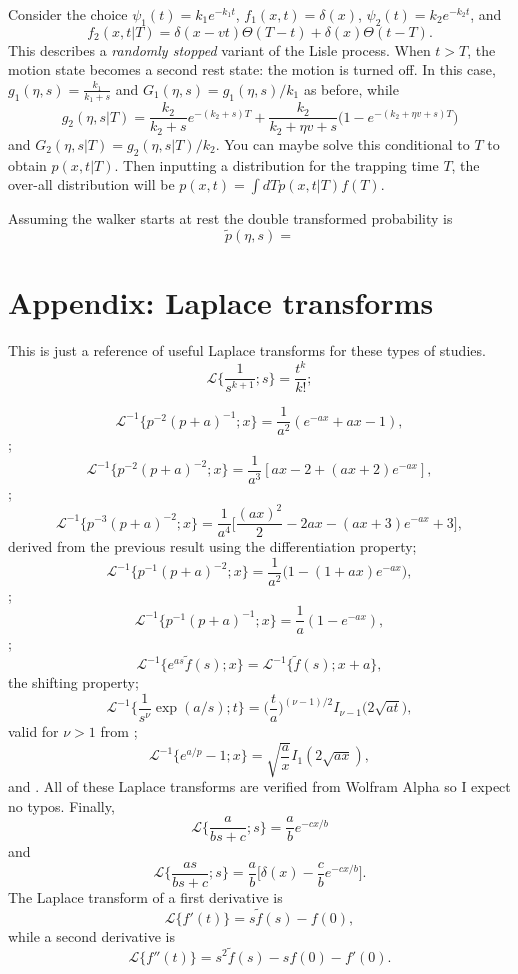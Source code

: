 \documentclass[11pt]{article}
\newcommand\be{\begin{equation}} %
\newcommand\ee{\end{equation}}   %
\newcommand\El{\mathcal{L}}
\begin{document}
Consider the choice $\psi_1(t) = k_1e^{-k_1t}$, $f_1(x,t)=\delta(x)$, $\psi_2(t) = k_2e^{-k_2t}$, and 
\be f_2(x,t|T) = \delta(x-vt)\Theta(T-t) + \delta(x)\Theta(t-T).\ee
This describes a \textit{randomly stopped} variant of the Lisle process.
When $t>T$, the motion state becomes a second rest state: the motion is turned off.
In this case, $g_1(\eta,s) = \frac{k_1}{k_1+s}$ and $G_1(\eta,s) = g_1(\eta,s)/k_1$ as before, while
\be g_2(\eta,s|T) = \frac{k_2}{k_2+s}e^{-(k_2+s)T} + \frac{k_2}{k_2 + \eta v + s}\Big(1-e^{-(k_2 + \eta v + s)T}\Big)\ee
and $G_2(\eta,s|T) = g_2(\eta,s|T)/k_2$.
You can maybe solve this conditional to $T$ to obtain $p(x,t|T)$.
Then inputting a distribution for the trapping time $T$, the over-all distribution will be $p(x,t) = \int dT p(x,t|T)f(T)$.

Assuming the walker starts at rest the double transformed probability is
\be \tilde{p}(\eta,s) = \ee


\section*{Appendix: Laplace transforms}
This is just a reference of useful Laplace transforms for these types of studies.
\be \El\Big\{\frac{1}{s^{k+1}};s\Big\} = \frac{t^k}{k!}; \label{eq:lap1}\ee

\be \El^{-1}\Big\{p^{-2}(p+a)^{-1};x\Big\} = \frac{1}{a^2}(e^{-ax}+ax-1),\label{eq:lap2}\ee
\citep[][2.1.2.33]{Prudnikov1986};
\be \El^{-1}\Big\{p^{-2}(p+a)^{-2};x\Big\} = \frac{1}{a^3}[ax - 2 + (ax+2)e^{-ax}],\label{eq:lap3}\ee
\citep[][2.1.2.49]{Prudnikov1986};
\be \El^{-1}\Big\{p^{-3}(p+a)^{-2};x\Big\} = \frac{1}{a^4}\Big[\frac{(ax)^2}{2} - 2ax - (ax+3)e^{-ax} + 3\Big], \label{eq:lap4}\ee
derived from the previous result using the differentiation property;
\be \El^{-1}\Big\{p^{-1}(p+a)^{-2};x\Big\} = \frac{1}{a^2}\Big(1 -(1+ax)e^{-ax}\Big), \label{eq:lap5}\ee
\citep[][2.1.2.47]{Prudnikov1986};
\be \El^{-1}\Big\{p^{-1}(p+a)^{-1};x\Big\} = \frac{1}{a}(1-e^{-ax}),\label{eq:lap6}\ee
\citep[][2.1.2.31]{Prudnikov1986};
\be\El^{-1} \{e^{as}\tilde{f}(s);x\} = \El^{-1}\{\tilde{f}(s);x+a\},\label{eq:lap7}\ee
the shifting property;
\be \El^{-1}\big\{\frac{1}{s^\nu}\exp(a/s);t\} = \Big(\frac{t}{a}\Big)^{(\nu-1)/2}I_{\nu-1}\big(2\sqrt{a t}\big), \label{eq:lap8}\ee
valid for $\nu>1$ from \citep[][2.2.2.1]{Prudnikov1986};
\be \El^{-1}\{e^{a/p}-1;x\} = \sqrt{\frac{a}{x}}I_1(2\sqrt{ax}),\label{eq:lap9}\ee
and \citep[][2.2.2.8]{Prudnikov1986}.
All of these Laplace transforms are verified from Wolfram Alpha so I expect no typos.
Finally,
\be \El\Big\{\frac{a}{bs+c};s\Big\} = \frac{a}{b}e^{-cx/b}\label{eq:lap10}\ee
and
\be \El\Big\{\frac{as}{bs+c};s\Big\} = \frac{a}{b}\Big[\delta(x) - \frac{c}{b}e^{-cx/b}\Big].\label{eq:lap11}\ee
The Laplace transform of a first derivative is 
\be \El\{f'(t)\} = s\tilde{f}(s)-f(0),\ee
while a second derivative is 
\be \El\{f''(t)\} = s^2 \tilde{f}(s) - sf(0) -f'(0).\ee
\end{document}
